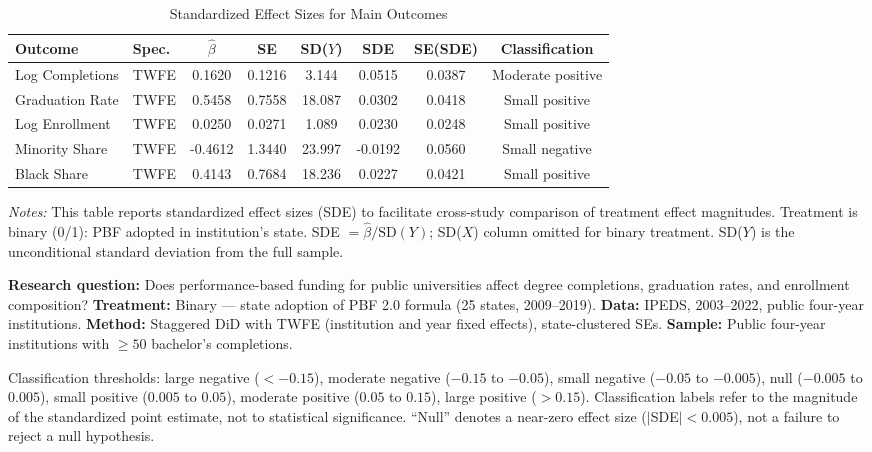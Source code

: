 \begin{table}[H]
\centering
\caption{Standardized Effect Sizes for Main Outcomes}
\label{tab:sde}
\begin{adjustbox}{max width=\textwidth}
\begin{tabular}{llcccccc}
\toprule
Outcome & Spec. & $\hat{\beta}$ & SE & SD($Y$) & SDE & SE(SDE) & Classification \\
\midrule
Log Completions & TWFE & 0.1620 & 0.1216 & 3.144 & 0.0515 & 0.0387 & Moderate positive \\
Graduation Rate & TWFE & 0.5458 & 0.7558 & 18.087 & 0.0302 & 0.0418 & Small positive \\
Log Enrollment & TWFE & 0.0250 & 0.0271 & 1.089 & 0.0230 & 0.0248 & Small positive \\
Minority Share & TWFE & -0.4612 & 1.3440 & 23.997 & -0.0192 & 0.0560 & Small negative \\
Black Share & TWFE & 0.4143 & 0.7684 & 18.236 & 0.0227 & 0.0421 & Small positive \\
\bottomrule
\end{tabular}
\end{adjustbox}
\par\vspace{0.3em}
{\footnotesize \emph{Notes:} This table reports standardized effect sizes (SDE)
to facilitate cross-study comparison of treatment effect magnitudes.
Treatment is binary (0/1): PBF adopted in institution's state.
SDE $= \hat{\beta} / \text{SD}(Y)$; SD($X$) column omitted for binary treatment.
SD($Y$) is the unconditional standard deviation from the full sample.

\textbf{Research question:} Does performance-based funding for public universities
affect degree completions, graduation rates, and enrollment composition?
\textbf{Treatment:} Binary --- state adoption of PBF 2.0 formula (25 states, 2009--2019).
\textbf{Data:} IPEDS, 2003--2022, public four-year institutions.
\textbf{Method:} Staggered DiD with TWFE (institution and year fixed effects), state-clustered SEs.
\textbf{Sample:} Public four-year institutions with $\geq 50$ bachelor's completions.

Classification thresholds:
large negative ($< -0.15$), moderate negative ($-0.15$ to $-0.05$),
small negative ($-0.05$ to $-0.005$), null ($-0.005$ to $0.005$),
small positive ($0.005$ to $0.05$), moderate positive ($0.05$ to $0.15$),
large positive ($> 0.15$).
Classification labels refer to the magnitude of the standardized point estimate,
not to statistical significance. ``Null'' denotes a near-zero effect size
($|$SDE$| < 0.005$), not a failure to reject a null hypothesis.}
\end{table}
